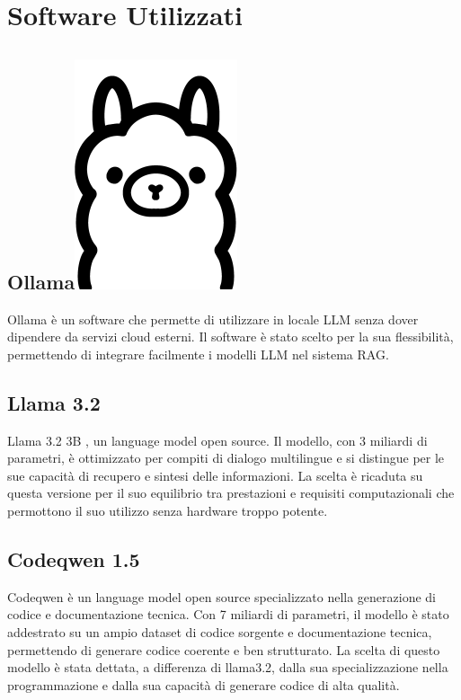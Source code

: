 \documentclass[12pt,a4paper,openright,twoside]{book}
\begin{document}
\section{Software Utilizzati}
\subsection{Ollama\hspace{0.3cm}\protect\includegraphics[width=0.03\linewidth]{figures/ollama.png}}
Ollama \cite{ollama-docs} è un software che permette di utilizzare in locale LLM
senza dover dipendere da servizi cloud esterni.
Il software è stato scelto per la sua flessibilità, permettendo di integrare facilmente i modelli LLM nel sistema RAG.

\subsection{Llama 3.2}
Llama 3.2 3B \cite{llama3-2}, un language model open source.
Il modello, con 3 miliardi di parametri, è ottimizzato per compiti di dialogo multilingue e si distingue per le sue capacità di recupero e sintesi delle informazioni.
La scelta è ricaduta su questa versione per il suo equilibrio tra prestazioni e requisiti computazionali che permottono il suo utilizzo senza hardware troppo potente.

\subsection{Codeqwen 1.5}
Codeqwen \cite{codeqwen1.5} è un language model open source specializzato nella generazione di codice e documentazione tecnica.  
Con 7 miliardi di parametri, il modello è stato addestrato su un ampio dataset di codice sorgente e documentazione tecnica, permettendo di generare codice coerente e ben strutturato.
La scelta di questo modello è stata dettata, a differenza di llama3.2, dalla sua specializzazione nella programmazione e dalla sua capacità di generare codice di alta qualità. 
\end{document}
